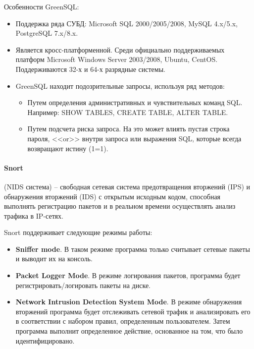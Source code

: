 Особенности GreenSQL:
\begin{itemize}
	\item Поддержка ряда СУБД: Microsoft SQL 2000/2005/2008, MySQL 4.x/5.x, PostgreSQL 7.x/8.x.

	\item Является кросс-платформенной. Среди официально поддерживаемых платформ Microsoft
	Windows Server 2003/2008, Ubuntu, CentOS. Поддерживаются 32-х и 64-х разрядные системы.

	\item GreenSQL находит подозрительные запросы, используя ряд методов:
	\begin{itemize}
		\item Путем определения административных и чувствительных команд SQL.
		Например: SHOW TABLES, CREATE TABLE, ALTER TABLE.

		\item Путем подсчета риска запроса. На это может влиять пустая строка пароля, <<or>>
		внутри запроса или выражения SQL, которые всегда возвращают истину (1=1).
	\end{itemize}

\end{itemize}


\paragraph*{Snort} (NIDS система) -- свободная сетевая система предотвращения вторжений (IPS)
и обнаружения вторжений (IDS) с открытым исходным кодом, способная выполнять регистрацию
пакетов и в реальном времени осуществлять анализ трафика в IP-сетях.

Snort поддерживает следующие режимы работы:
\begin{itemize}
	\item \textbf{Sniffer mode}. В таком режиме программа только считывает сетевые пакеты и
	выводит их на консоль.

	\item \textbf{Packet Logger Mode}. В режиме логирования пакетов, программа будет
	регистрировать/логировать пакеты на диске.

	\item \textbf{Network Intrusion Detection System Mode}. В режиме обнаружения вторжений
	программа будет отслеживать сетевой трафик и анализировать его в соответствии с набором
	правил, определенным пользователем. Затем программа выполнит определенное действие,
	основанное на том, что было идентифицировано.
\end{itemize}

